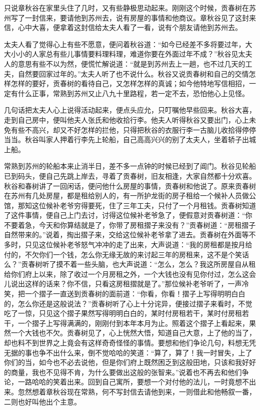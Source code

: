 \documentclass[12pt,UTF8]{ctexbook}
\begin{document}
{{{只说章秋谷在家里头住了几时，又有些静极思动起来。刚刚这个时候，贡春树在苏州写了一封信来，要请他到苏州去，说有房屋的事情和他商议。章秋谷见了这封来信，心中大喜，便拿着这封信给太夫人看了一看，说有个朋友请他到苏州去。

太夫人看了觉得心上有些不愿意，便问着秋谷道：“如今已经差不多将要过年，大大小小的人家总有些儿事情要料理料理，难道你要在外面过年不成？”秋谷见太夫人的意思有些不以为然，便慌忙解说道：“就是到苏州去上一趟，也不过几天的工夫，自然要回家过年的。”太夫人听了也不说什么。秋谷又说贡春树和自己的交情怎样怎样的要好，贡春树的看待自己，又怎样怎样的真诚；如今他特地写信相招，一定有什么正事，常熟到苏州又止八九十里路程，若一定不去，恐怕他心上见怪。

几句话把太夫人心上说得活动起来，便点头应允，只叮嘱他早些回来。秋谷大喜，走到自己房中，便叫他夫人张氏和他收拾行李。他夫人听得秋谷又要出门，心上未免有些不高兴，却又不好怎样的拦他，只得把秋谷的衣服行李一古脑儿收拾得停停当当。秋谷叫家人押着行李先上轮船，自己高高兴兴的别了太夫人，坐着轿子出城上船。

常熟到苏州的轮船本来止消半日，差不多一点钟的时候已经到了阊门。秋谷见轮船已到码头，便自己先跳上岸去，寻着了贡春树，旧友相逢，大家自然都十分欢喜。秋谷和春树讲了一回闲话，便问他什么房屋的事情，贡春树和他说了。原来贡春树在苏州有几处房屋，都是租给别人的，有一所护龙街的房子租给一个候补人员做公馆，那知这位候补老爷穷得要死，住了三年工夫，只付了一个月租钱。贡春树知道了这件事情，便自己上门去讨，讨得这位候补老爷急了，便假意对贡春树道：“你不要着急，今天和你算结就是了，你带了房租摺子来没有？”贡春树道：“房租摺子自然带来的。”说着，掏出摺子来，交给这位候补老爷拿了进去。贡春树在外面等不多时，只见这位候补老爷怒气冲冲的走了出来，大声说道：“我的房租都是按月给付的，不欠你们一个钱，怎么你无缘无故的来讨起三年的房租来，这不是个笑话么？”贡春树听了摸不着一些头脑，也大声说道：“怎么，怎么？我这所房屋自从租给你们府上以来，除了收过一个月房租之外，一个大钱也没有见你付过，怎么这会儿说出这样的话来？你不信，只看这房租摺就是了。”那位候补老爷听了，一声冷笑，把一个摺子一直送到贡春树的面前道：“你看，你看！摺子上写得明明白白的，怎么你还是这般说法？”贡春树听了心上十分诧异，便接过摺子来看时，不觉吃了一惊，只见这个摺子果然写得明明白白的，某时付房租若干，某时付房租若干，一个摺子上写得满满的，刚刚付到本年本月为止。照着这个摺子上看起来，果然一个大钱也不欠。贡春树见了，心上恍然大悟，知道自己大意，上了他的当了，却也料不到世界之上竟会有这样奇奇怪怪的事情。要想和他们争论几句，料想无凭无据的事也争不出什么来，倒不觉哈哈的笑道：“算了，算了！我一时冒失，上了你们的当，如今也不必去说他，但是你们府上既然困乏到这般田地，只该和我好好的商量，我也不见得不肯，为什么要做出这般的张智来。”说着也不再去和他们争论，一路哈哈的笑着出来。回到自己寓所，要想一个对付他的法儿，一时竟想不出来。忽然想着章秋谷现在常熟，何不写封信去请他到来，一则借此和他畅叙一番，二则也好叫他出个主意。

}}}
\end{document}
